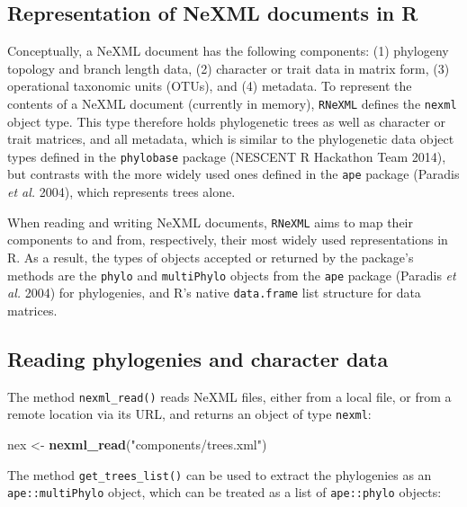 \documentclass[author-year, review, 11pt]{components/elsarticle} %
\newenvironment{Shaded}{\begin{snugshade}}{\end{snugshade}}
\newcommand{\KeywordTok}[1]{\textcolor[rgb]{0.13,0.29,0.53}{\textbf{{#1}}}}
\newcommand{\StringTok}[1]{\textcolor[rgb]{0.31,0.60,0.02}{{#1}}}
\newcommand{\NormalTok}[1]{{#1}}
\begin{document}
\subsection{Representation of NeXML documents in
R}\label{representation-of-nexml-documents-in-r}

Conceptually, a NeXML document has the following components: (1)
phylogeny topology and branch length data, (2) character or trait data
in matrix form, (3) operational taxonomic units (OTUs), and (4)
metadata. To represent the contents of a NeXML document (currently in
memory), \texttt{RNeXML} defines the \texttt{nexml} object type. This
type therefore holds phylogenetic trees as well as character or trait
matrices, and all metadata, which is similar to the phylogenetic data
object types defined in the \texttt{phylobase} package (NESCENT R
Hackathon Team 2014), but contrasts with the more widely used ones
defined in the \texttt{ape} package (Paradis \emph{et al.} 2004), which
represents trees alone.

When reading and writing NeXML documents, \texttt{RNeXML} aims to map
their components to and from, respectively, their most widely used
representations in R. As a result, the types of objects accepted or
returned by the package's methods are the \texttt{phylo} and
\texttt{multiPhylo} objects from the \texttt{ape} package (Paradis
\emph{et al.} 2004) for phylogenies, and R's native \texttt{data.frame}
list structure for data matrices.

\subsection{Reading phylogenies and character
data}\label{reading-phylogenies-and-character-data}

The method \texttt{nexml\_read()} reads NeXML files, either from a local
file, or from a remote location via its URL, and returns an object of
type \texttt{nexml}:

\begin{Shaded}
\begin{Highlighting}[]
\NormalTok{nex <-}\StringTok{ }\KeywordTok{nexml_read}\NormalTok{(}\StringTok{"components/trees.xml"}\NormalTok{)}
\end{Highlighting}
\end{Shaded}

The method \texttt{get\_trees\_list()} can be used to extract the
phylogenies as an \texttt{ape::multiPhylo} object, which can be treated
as a list of \texttt{ape::phylo} objects:
\end{document}

